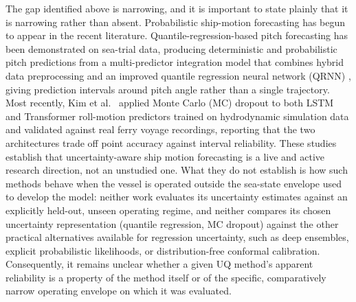 \documentclass[a4paper,fleqn]{cas-sc}
\begin{document}
The gap identified above is narrowing, and it is important to state plainly that it is narrowing rather than absent. Probabilistic ship-motion forecasting has begun to appear in the recent literature. Quantile-regression-based pitch forecasting has been demonstrated on sea-trial data, producing deterministic and probabilistic pitch predictions from a multi-predictor integration model that combines hybrid data preprocessing and an improved quantile regression neural network (QRNN) \cite{aei2022qrnnpitch}, giving prediction intervals around pitch angle rather than a single trajectory. Most recently, Kim et al.~\cite{kim2025mcdropoutroll} applied Monte Carlo (MC) dropout to both LSTM and Transformer roll-motion predictors trained on hydrodynamic simulation data and validated against real ferry voyage recordings, reporting that the two architectures trade off point accuracy against interval reliability. These studies establish that uncertainty-aware ship motion forecasting is a live and active research direction, not an unstudied one. What they do not establish is how such methods behave when the vessel is operated outside the sea-state envelope used to develop the model: neither work evaluates its uncertainty estimates against an explicitly held-out, unseen operating regime, and neither compares its chosen uncertainty representation (quantile regression, MC dropout) against the other practical alternatives available for regression uncertainty, such as deep ensembles, explicit probabilistic likelihoods, or distribution-free conformal calibration. Consequently, it remains unclear whether a given UQ method's apparent reliability is a property of the method itself or of the specific, comparatively narrow operating envelope on which it was evaluated.
\end{document}
